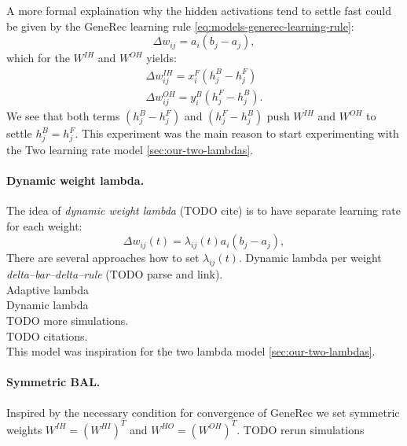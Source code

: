 A more formal explaination why the hidden activations tend to settle fast could be given by the GeneRec learning rule \ref{eq:models-generec-learning-rule}: 
\begin{equation} 
  \Delta w_{ij} = a_i(b_j - a_j),
\end{equation} 
which for the $W^{IH}$ and $W^{OH}$ yields: 
\begin{align} 
  \Delta w_{ij}^{IH} = x^F_i(h^B_j - h^F_j) \\ 
  \Delta w_{ij}^{OH} = y^B_i(h^F_j - h^B_j). 
\end{align} 
We see that both terms $(h^B_j - h^F_j)$ and $(h^F_j - h^B_j)$ push $W^{IH}$ and $W^{OH}$ to settle $h^B_j = h^F_j$. This experiment was the main reason to start experimenting with the Two learning rate model \ref{sec:our-two-lambdas}. 

\paragraph{Dynamic weight lambda.} 
\label{sec:our-dynamic-lambda} 
The idea of \emph{dynamic weight lambda} (TODO cite) is to have separate learning rate for each weight: 
\begin{equation}
\Delta w_{ij}(t) = \lambda_{ij}(t) a_i\left(b_j - a_j\right), 
\end{equation}
There are several approaches how to set $\lambda_{ij}(t)$. Dynamic lambda per weight \emph{delta--bar--delta--rule} \citep{jacobs1988increased} (TODO parse and link). \\
Adaptive lambda \citep{riedmiller1993direct} \\
Dynamic lambda \citep{yu1997efficient} \\ 
TODO more simulations.  \\
TODO citations.  \\
This model was inspiration for the two lambda model \ref{sec:our-two-lambdas}. 

\paragraph{Symmetric BAL.}

Inspired by the necessary condition for convergence of GeneRec \citep{o1996bio} we set symmetric weights $W^{IH} = (W^{HI})^T$ and $W^{HO} = (W^{OH})^T$. 
TODO rerun simulations 

